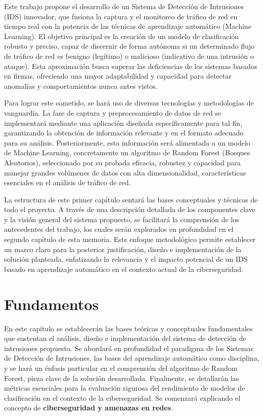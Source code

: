 Este trabajo propone el desarrollo de un Sistema de Detección de Intrusiones (IDS) innovador, que fusiona la captura y el monitoreo de tráfico de red en tiempo real con la potencia de las técnicas de aprendizaje automático (Machine Learning). El objetivo principal es la creación de un modelo de clasificación robusto y preciso, capaz de discernir de forma autónoma si un determinado flujo de tráfico de red es benigno (legítimo) o malicioso (indicativo de una intrusión o ataque). Esta aproximación busca superar las deficiencias de los sistemas basados en firmas, ofreciendo una mayor adaptabilidad y capacidad para detectar anomalías y comportamientos nunca antes vistos.

Para lograr este cometido, se hará uso de diversas tecnologías y metodologías de vanguardia. La fase de captura y preprocesamiento de datos de red se implementará mediante una aplicación diseñada específicamente para tal fin, garantizando la obtención de información relevante y en el formato adecuado para su análisis. Posteriormente, esta información será alimentada a un modelo de Machine Learning, concretamente un algoritmo de Random Forest (Bosques Aleatorios), seleccionado por su probada eficacia, robustez y capacidad para manejar grandes volúmenes de datos con alta dimensionalidad, características esenciales en el análisis de tráfico de red.

La estructura de este primer capítulo sentará las bases conceptuales y técnicas de todo el proyecto. A través de una descripción detallada de los componentes clave y la visión general del sistema propuesto, se facilitará la comprensión de los antecedentes del trabajo, los cuales serán explorados en profundidad en el segundo capítulo de esta memoria. Este enfoque metodológico permite establecer un marco claro para la posterior justificación, diseño e implementación de la solución planteada, enfatizando la relevancia y el impacto potencial de un IDS basado en aprendizaje automático en el contexto actual de la ciberseguridad.

\section{Fundamentos}

En este capítulo se establecerán las bases teóricas y conceptuales fundamentales que sustentan el análisis, diseño e implementación del sistema de detección de intrusiones propuesto. Se abordará en profundidad el paradigma de los Sistemas de Detección de Intrusiones, las bases del aprendizaje automático como disciplina, y se hará un énfasis particular en el comprensión del algoritmo de Random Forest, pieza clave de la solución desarrollada. Finalmente, se detallarán las métricas esenciales para la evaluación rigurosa del rendimiento de modelos de clasificación en el contexto de la ciberseguridad. Se comenzará explicando el concepto de \textbf{ciberseguridad y amenazas en redes}.



